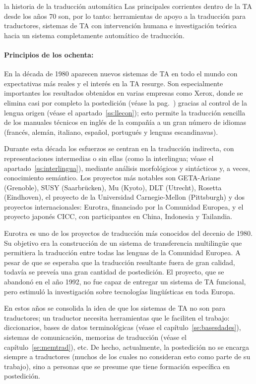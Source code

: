 \begin{persabermes}{la historia de la traducción automática}
Las principales corrientes dentro de la TA desde los años 70 son, por lo tanto: herramientas de apoyo a la traducción para traductores, sistemas de TA con intervención humana e investigación teórica hacia un sistema completamente automático de traducción. 

\paragraph{Principios de los ochenta:} En la década de 1980 aparecen nuevos sistemas de TA en todo el mundo con expectativas más reales y el interés en la TA resurge. Son especialmente importantes los resultados obtenidos en varias empresas como Xerox, donde se elimina casi por completo la postedición (véase la pag.~\pageref{pg:homografia}) gracias al control de la lengua origen (véase el apartado~\ref{ss:llecon}); esto permite la traducción sencilla de los manuales técnicos en inglés de la compañía a un gran número de idiomas (francés, alemán, italiano, español, portugués y lenguas escandinavas). 

Durante esta década los esfuerzos se centran en la traducción indirecta, con representaciones intermedias o sin ellas (como la interlingua; véase el apartado~\ref{ss:interlingua}), mediante análisis morfológicos y sintácticos y, a veces, conocimiento semántico. Los proyectos más notables son GETA-Ariane (Grenoble), SUSY (Saarbrücken), Mu (Kyoto), DLT (Utrecht), Rosetta (Eindhoven), el proyecto de la Universidad Carnegie-Mellon (Pittsburgh) y dos proyectos internacionales: Eurotra, financiado por la Comunidad Europea, y el proyecto japonés CICC, con participantes en China, Indonesia y Tailandia. 

Eurotra es uno de los proyectos de traducción más conocidos del decenio de 1980. Su objetivo era la construcción de un sistema de transferencia multilingüe que permitiera la traducción entre todas las lenguas de la Comunidad Europea. A pesar de que se esperaba que la traducción resultante fuera de gran calidad, todavía se preveía una gran cantidad de postedición. El proyecto, que se abandonó en el año 1992, no fue capaz de entregar un sistema de TA funcional, pero estimuló la investigación sobre tecnologías lingüísticas en toda Europa. 

En estos años se consolida la idea de que los sistemas de TA no son para traductores; un traductor necesita herramientas que le faciliten el trabajo: diccionarios, bases de datos terminológicas (véase el capítulo~\ref{se:basesdades}), sistemas de comunicación, memorias de traducción (véase el capítulo~\ref{se:memtrad}), etc. De hecho, actualmente, la postedición no se encarga siempre a traductores (muchos de los cuales no consideran esto como parte de su trabajo), sino a personas que se presume que tiene formación específica en postedición. 


\end{persabermes}
